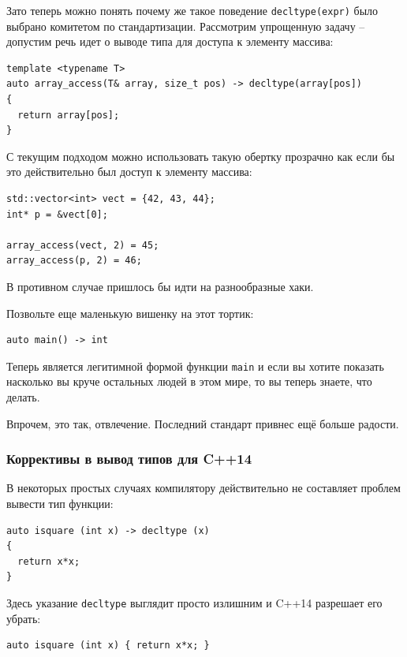 \documentclass[a4paper,12pt,oneside]{article}
\begin{document}
Зато теперь можно понять почему же такое поведение \lstinline!decltype(expr)! было выбрано комитетом по стандартизации. Рассмотрим упрощенную задачу -- допустим речь идет о выводе типа для доступа к элементу массива:

\begin{lstlisting}
template <typename T>
auto array_access(T& array, size_t pos) -> decltype(array[pos]) 
{
  return array[pos];
}
\end{lstlisting}

С текущим подходом можно использовать такую обертку прозрачно как если бы это действительно был доступ к элементу массива:

\begin{lstlisting}
std::vector<int> vect = {42, 43, 44};
int* p = &vect[0];

array_access(vect, 2) = 45;
array_access(p, 2) = 46;
\end{lstlisting}

В противном случае пришлось бы идти на разнообразные хаки.

Позвольте еще маленькую вишенку на этот тортик:

\begin{lstlisting}
auto main() -> int
\end{lstlisting}

Теперь является легитимной формой функции \lstinline!main! и если вы хотите показать насколько вы круче остальных людей в этом мире, то вы теперь знаете, что делать.

Впрочем, это так, отвлечение. Последний стандарт привнес ещё больше радости.

\subsubsection{Коррективы в вывод типов для C++14}\label{DecltypeAuto14}

В некоторых простых случаях компилятору действительно не составляет проблем вывести тип функции: 

\begin{lstlisting}
auto isquare (int x) -> decltype (x) 
{ 
  return x*x;
}
\end{lstlisting}

Здесь указание \lstinline!decltype! выглядит просто излишним и C++14 разрешает его убрать:

\begin{lstlisting}
auto isquare (int x) { return x*x; }
\end{lstlisting}
\end{document}
